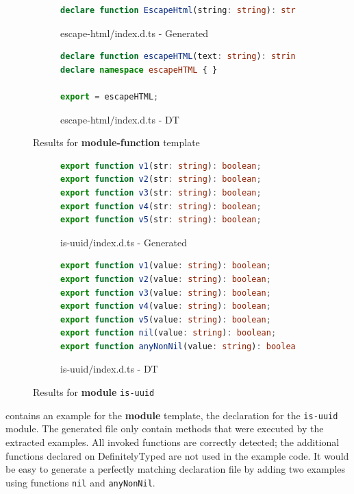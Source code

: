 \documentclass[sigconf]{acmart}
\begin{document}
\begin{figure}[tp]
\begin{subfigure}[t]{0.48\linewidth}
\begin{lstlisting}[language=TypeScript,numbers=none]
declare function EscapeHtml(string: string): string;

        \end{lstlisting}
        \caption{escape-html/index.d.ts - Generated}
      \end{subfigure}
      \hfill
      \begin{subfigure}[t]{0.48\linewidth}
        \begin{lstlisting}[language=TypeScript,numbers=none]
declare function escapeHTML(text: string): string;
declare namespace escapeHTML { }

export = escapeHTML;
        \end{lstlisting}
        \caption{escape-html/index.d.ts - DT}
      \end{subfigure}

    \caption{Results for \textbf{module-function} template}
    \label{fig:experiments-results-module-function}
\end{figure}


\begin{figure}[tp]
  \centering
  \begin{subfigure}[t]{0.48\linewidth}
    \begin{lstlisting}[language=TypeScript,numbers=none]
export function v1(str: string): boolean;
export function v2(str: string): boolean;
export function v3(str: string): boolean;
export function v4(str: string): boolean;
export function v5(str: string): boolean;
    \end{lstlisting}
    \caption{is-uuid/index.d.ts - Generated}
  \end{subfigure}
  \hfill
  \begin{subfigure}[t]{0.48\linewidth}
    \begin{lstlisting}[language=TypeScript,numbers=none]
export function v1(value: string): boolean;
export function v2(value: string): boolean;
export function v3(value: string): boolean;
export function v4(value: string): boolean;
export function v5(value: string): boolean;
export function nil(value: string): boolean;
export function anyNonNil(value: string): boolean;
    \end{lstlisting}
    \caption{is-uuid/index.d.ts - DT}
  \end{subfigure}

  \caption{Results for \textbf{module} \texttt{is-uuid}}
  \label{fig:experiments-results-module-is-uuid}
\end{figure}

 contains an example
for the \textbf{module} template, the declaration for the \texttt{is-uuid} module.
The generated file only contain methods that were executed by the extracted
examples. All invoked functions are correctly detected; the additional
functions declared on DefinitelyTyped are not used in the example
code.
It would be easy to generate a perfectly matching declaration file by
adding two examples using functions \texttt{nil} and
\texttt{anyNonNil}. 
\end{document}
